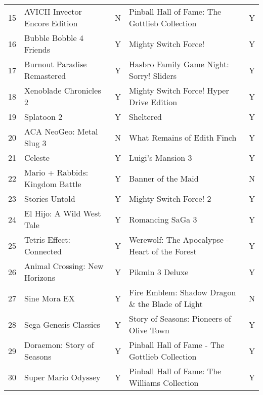 \begin{tabular}{rllll}
   15 &                 AVICII Invector Encore Edition &         N &      Pinball Hall of Fame: The Gottlieb Collection &         Y \\
   16 &                        Bubble Bobble 4 Friends &         Y &                               Mighty Switch Force! &         Y \\
   17 &                    Burnout Paradise Remastered &         Y &           Hasbro Family Game Night: Sorry! Sliders &         Y \\
   18 &                         Xenoblade Chronicles 2 &         Y &           Mighty Switch Force! Hyper Drive Edition &         Y \\
   19 &                                     Splatoon 2 &         Y &                                          Sheltered &         Y \\
   20 &                       ACA NeoGeo: Metal Slug 3 &         N &                        What Remains of Edith Finch &         Y \\
   21 &                                        Celeste &         Y &                                  Luigi's Mansion 3 &         Y \\
   22 &                Mario + Rabbids: Kingdom Battle &         Y &                                 Banner of the Maid &         N \\
   23 &                                 Stories Untold &         Y &                             Mighty Switch Force! 2 &         Y \\
   24 &                      El Hijo: A Wild West Tale &         Y &                                   Romancing SaGa 3 &         Y \\
   25 &                       Tetris Effect: Connected &         Y &     Werewolf: The Apocalypse - Heart of the Forest &         Y \\
   26 &                  Animal Crossing: New Horizons &         Y &                                    Pikmin 3 Deluxe &         Y \\
   27 &                                   Sine Mora EX &         Y &    Fire Emblem: Shadow Dragon \& the Blade of Light &         N \\
   28 &                          Sega Genesis Classics &         Y &           Story of Seasons: Pioneers of Olive Town &         Y \\
   29 &                     Doraemon: Story of Seasons &         Y &     Pinball Hall of Fame - The Gottlieb Collection &         Y \\
   30 &                            Super Mario Odyssey &         Y &      Pinball Hall of Fame: The Williams Collection &         Y \\
\bottomrule
\end{tabular}
